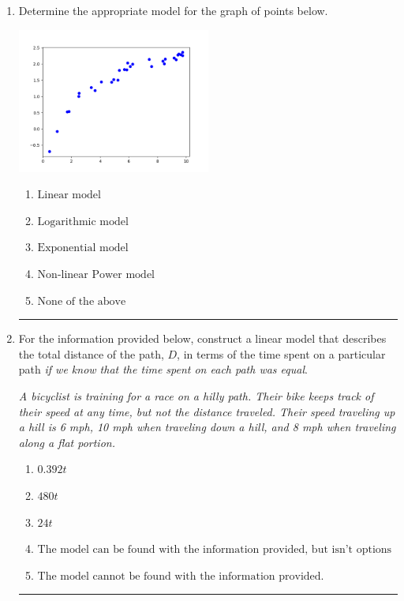 \documentclass[14pt]{extbook}
\newcommand{\litem}[1]{\item#1\hspace*{-1cm}\rule{\textwidth}{0.4pt}}
\begin{document}
\begin{enumerate}
{\begin{enumerate}[label=\Alph*.]
\end{enumerate} }
\litem{
Determine the appropriate model for the graph of points below.
\begin{center}
    \includegraphics[width=0.5\textwidth]{../Figures/identifyModelGraph12B.png}
\end{center}
\begin{enumerate}[label=\Alph*.]
\item \( \text{Linear model} \)
\item \( \text{Logarithmic model} \)
\item \( \text{Exponential model} \)
\item \( \text{Non-linear Power model} \)
\item \( \text{None of the above} \)

\end{enumerate} }
\litem{
For the information provided below, construct a linear model that describes the total distance of the path, $D$, in terms of the time spent on a particular path \textit{if we know that the time spent on each path was equal}.
\begin{center}
    \textit{ A bicyclist is training for a race on a hilly path. Their bike keeps track of their speed at any time, but not the distance traveled. Their speed traveling up a hill is 6 mph, 10 mph when traveling down a hill, and 8 mph when traveling along a flat portion. }
\end{center}
\begin{enumerate}[label=\Alph*.]
\item \( 0.392 t \)
\item \( 480 t \)
\item \( 24 t \)
\item \( \text{The model can be found with the information provided, but isn't options 1-3.} \)
\item \( \text{The model cannot be found with the information provided.} \)


\end{enumerate}}
\end{enumerate}
\end{document}
